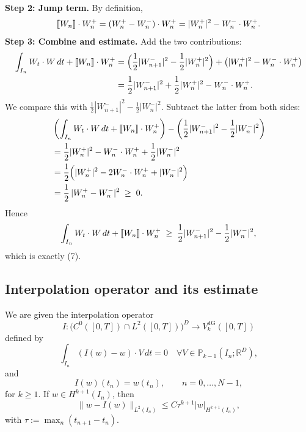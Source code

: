 \textbf{Step 2: Jump term.}
By definition,
\[
    \left[\!\left[ W_n \right]\!\right]\cdot W_n^+
    = (W_n^+ - W_n^-)\cdot W_n^+
    = |W_n^+|^2 - W_n^-\cdot W_n^+.
\]
\textbf{Step 3: Combine and estimate.}
Add the two contributions:
\begin{align*}
    \int_{I_n} W_t\cdot W\,dt + \left[\!\left[ W_n \right]\!\right]\cdot W_n^+
     & = \Bigl(\frac12 |W_{n+1}^-|^2 - \frac12 |W_n^+|^2\Bigr)
    + \bigl(|W_n^+|^2 - W_n^-\cdot W_n^+\bigr)                 \\
     & = \frac12 |W_{n+1}^-|^2
    + \frac12 |W_n^+|^2 - W_n^-\cdot W_n^+.
\end{align*}
We compare this with $\frac12 |W_{n+1}^-|^2 - \frac12 |W_n^-|^2$.
Subtract the latter from both sides:
\begin{align*}
     & \left(
    \int_{I_n} W_t\cdot W\,dt + \left[\!\left[ W_n \right]\!\right]\cdot W_n^+
    \right)
    - \left(\frac12 |W_{n+1}^-|^2 - \frac12 |W_n^-|^2\right)           \\
     & = \frac12 |W_n^+|^2 - W_n^-\cdot W_n^+ + \frac12 |W_n^-|^2      \\
     & = \frac12\Bigl(|W_n^+|^2 - 2 W_n^-\cdot W_n^+ + |W_n^-|^2\Bigr) \\
     & = \frac12\,|W_n^+ - W_n^-|^2 \;\ge\; 0.
\end{align*}
Hence
\[
    \int_{I_n} W_t\cdot W\,dt + \left[\!\left[ W_n \right]\!\right]\cdot W_n^+
    \;\ge\;
    \frac12 |W_{n+1}^-|^2 - \frac12 |W_n^-|^2,
\]
which is exactly (7).
\subsection*{Interpolation operator and its estimate}
We are given the interpolation operator
\[
    I : \bigl(C^0([0,T])\cap L^2([0,T])\bigr)^D \to V_k^{\mathrm{dG}}([0,T])
\]
defined by
\[
    \int_{I_n} (I(w) - w)\cdot V\,dt = 0
    \quad\forall V\in \mathbb{P}_{k-1}(I_n;\mathbb{R}^D),
\]
and
\[
    I(w)(t_n) = w(t_n),\qquad n=0,\dots,N-1,
\]
for $k\ge1$. If $w\in H^{k+1}(I_n)$, then
\[
    \|w - I(w)\|_{L^2(I_n)} \le C \tau^{k+1} |w|_{H^{k+1}(I_n)}, \tag{8}
\]
with $\tau := \max_n (t_{n+1}-t_n)$.
